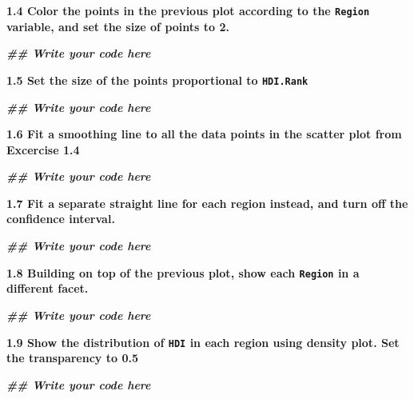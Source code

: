 \documentclass[
]{article}
\newenvironment{Shaded}{\begin{snugshade}}{\end{snugshade}}
\newcommand{\DocumentationTok}[1]{\textcolor[rgb]{0.56,0.35,0.01}{\textbf{\textit{#1}}}}
\begin{document}
\textbf{1.4 Color the points in the previous plot according to the
\texttt{Region} variable, and set the size of points to 2.}

\begin{Shaded}
\begin{Highlighting}[]
\DocumentationTok{\#\# Write your code here}
\end{Highlighting}
\end{Shaded}

\textbf{1.5 Set the size of the points proportional to
\texttt{HDI.Rank}}

\begin{Shaded}
\begin{Highlighting}[]
\DocumentationTok{\#\# Write your code here}
\end{Highlighting}
\end{Shaded}

\textbf{1.6 Fit a smoothing line to all the data points in the scatter
plot from Excercise 1.4}

\begin{Shaded}
\begin{Highlighting}[]
\DocumentationTok{\#\# Write your code here}
\end{Highlighting}
\end{Shaded}

\textbf{1.7 Fit a separate straight line for each region instead, and
turn off the confidence interval.}

\begin{Shaded}
\begin{Highlighting}[]
\DocumentationTok{\#\# Write your code here}
\end{Highlighting}
\end{Shaded}

\textbf{1.8 Building on top of the previous plot, show each
\texttt{Region} in a different facet.}

\begin{Shaded}
\begin{Highlighting}[]
\DocumentationTok{\#\# Write your code here}
\end{Highlighting}
\end{Shaded}

\textbf{1.9 Show the distribution of \texttt{HDI} in each region using
density plot. Set the transparency to 0.5}

\begin{Shaded}
\begin{Highlighting}[]
\DocumentationTok{\#\# Write your code here}
\end{Highlighting}
\end{Shaded}
\end{document}
